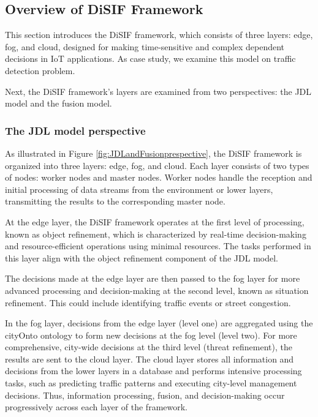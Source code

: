 \documentclass[5p,times]{elsarticle}
\begin{document}
\subsection{Overview of DiSIF Framework}

This section introduces the DiSIF framework, which consists of three layers: edge, fog, and cloud, designed for making time-sensitive and complex dependent decisions in IoT applications. 
As case study, we examine this model on traffic detection problem.

Next, the DiSIF framework's layers are examined from two perspectives: the JDL model and the fusion model.

\subsubsection{The JDL model perspective}








As illustrated in Figure \ref{fig:JDLandFusionprespective}, the DiSIF framework is organized into three layers: edge, fog, and cloud. Each layer consists of two types of nodes: worker nodes and master nodes. Worker nodes handle the reception and initial processing of data streams from the environment or lower layers, transmitting the results to the corresponding master node.

At the edge layer, the DiSIF framework operates at the first level of processing, known as object refinement, which is characterized by real-time decision-making and resource-efficient operations using minimal resources. The tasks performed in this layer align with the object refinement component of the JDL model.

The decisions made at the edge layer are then passed to the fog layer for more advanced processing and decision-making at the second level, known as situation refinement. This could include identifying traffic events or street congestion.

In the fog layer, decisions from the edge layer (level one) are aggregated using the cityOnto ontology to form new decisions at the fog level (level two). For more comprehensive, city-wide decisions at the third level (threat refinement), the results are sent to the cloud layer. The cloud layer stores all information and decisions from the lower layers in a database and performs intensive processing tasks, such as predicting traffic patterns and executing city-level management decisions. Thus, information processing, fusion, and decision-making occur progressively across each layer of the framework.
\end{document}
